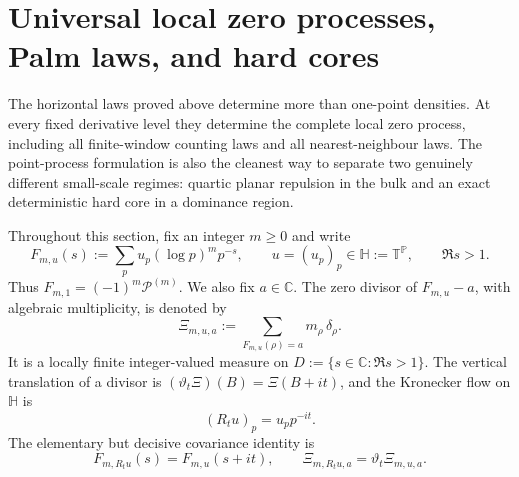 \documentclass[11pt]{article}
\theoremstyle{definition}
\theoremstyle{remark}
\newcommand{\PP}{\mathbb P}
\newcommand{\cP}{\mathcal P}
\newcommand{\C}{\mathbb C}
\begin{document}
%

\section{Universal local zero processes, Palm laws, and hard cores}
\label{sec:local-process}

The horizontal laws proved above determine more than one-point densities.  At
every fixed derivative level they determine the complete local zero process,
including all finite-window counting laws and all nearest-neighbour laws.  The
point-process formulation is also the cleanest way to separate two genuinely
different small-scale regimes: quartic planar repulsion in the bulk and an exact
deterministic hard core in a dominance region.

Throughout this section, fix an integer $m\geq0$ and write
\begin{equation}
 F_{m,u}(s):=\sum_pu_p(\log p)^mp^{-s},
 \qquad u=(u_p)_p\in\mathbb H:=\mathbb T^{\PP},
 \qquad \Re s>1.
 \label{eq:lp-family}
\end{equation}
Thus $F_{m,1}=(-1)^m\cP^{(m)}$.  We also fix $a\in\C$.  The zero divisor of
$F_{m,u}-a$, with algebraic multiplicity, is denoted by
\begin{equation}
 \Xi_{m,u,a}:=\sum_{F_{m,u}(\rho)=a}m_\rho\,\delta_\rho .
 \label{eq:lp-divisor}
\end{equation}
It is a locally finite integer-valued measure on
$D:=\{s\in\C:\Re s>1\}$.  The vertical translation of a divisor is
$(\vartheta_t\Xi)(B)=\Xi(B+it)$, and the Kronecker flow on $\mathbb H$ is
\begin{equation}
 (R_tu)_p=u_pp^{-it}.
 \label{eq:lp-flow}
\end{equation}
The elementary but decisive covariance identity is
\begin{equation}
 F_{m,R_tu}(s)=F_{m,u}(s+it),
 \qquad
 \Xi_{m,R_tu,a}=\vartheta_t\Xi_{m,u,a}.
 \label{eq:lp-covariance}
\end{equation}
\end{document}

